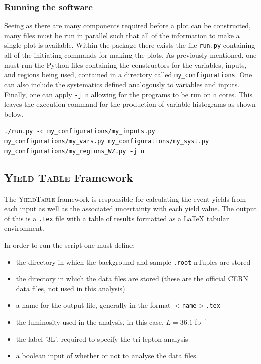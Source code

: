 \subsubsection{Running the software}
Seeing as there are many components required before a plot can be constructed, many files must be run in parallel such that all of the information to make a single plot is available.
Within the package there exists the file \texttt{run.py} containing all of the initiating commands for making the plots.
As previously mentioned, one must run the Python files containing the constructors for the variables, inputs, and regions being used, contained in a directory called \texttt{my\_configurations}.
One can also include the systematics defined analogously to variables and inputs.
Finally, one can apply \texttt{-j n} allowing for the programs to be run on \texttt{n} cores.
This leaves the execution command for the production of variable histograms as shown below.

\begin{center}
\texttt{./run.py -c my\_configurations/my\_inputs.py my\_configurations/my\_vars.py my\_configurations/my\_syst.py my\_configurations/my\_regions\_WZ.py -j n}
\end{center}

\subsection{Y{\scshape ield Table} Framework}

The Y{\scshape ieldTable} framework is responsible for calculating the event yields from each input as well as the associated uncertainty with each yield value.
The output of this is a \texttt{.tex} file with a table of results formatted as a LaTeX tabular environment.

In order to run the script one must define:
\begin{itemize}
\item the directory in which the background and sample \texttt{.root} nTuples are stored
\item the directory in which the data files are stored (these are the official CERN data files, not used in this analysis)
\item a name for the output file, generally in the format \texttt{$<$name$>$.tex}
\item the luminosity used in the analysis, in this case, $L = 36.1$ fb$^{-1}$
\item the label '3L', required to specify the tri-lepton analysis
\item a boolean input of whether or not to analyse the data files.
\end{itemize}

